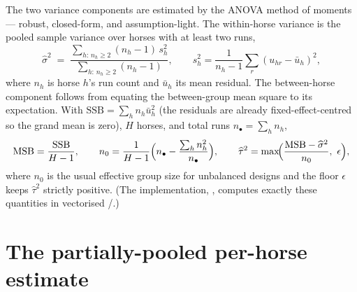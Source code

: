 The two variance components are estimated by the ANOVA method of moments --- robust, closed-form,
and assumption-light. The within-horse variance is the pooled sample variance over horses with at
least two runs,
\begin{equation}
  \widehat{\sigma}^2
   \;=\; \frac{\sum_{h:\,n_h\ge 2}(n_h-1)\,s_h^2}{\sum_{h:\,n_h\ge 2}(n_h-1)},
  \qquad
  s_h^2 = \frac{1}{n_h-1}\sum_{r}(u_{hr}-\bar u_{h})^2,
  \label{eq:sigma2}
\end{equation}
where $n_h$ is horse $h$'s run count and $\bar u_h$ its mean residual. The between-horse component
follows from equating the between-group mean square to its expectation. With
$\mathrm{SSB}=\sum_h n_h \bar u_h^2$ (the residuals are already fixed-effect-centred so the grand
mean is zero), $H$ horses, and total runs $n_\bullet=\sum_h n_h$,
\begin{equation}
  \mathrm{MSB} = \frac{\mathrm{SSB}}{H-1},
  \qquad
  n_0 = \frac{1}{H-1}\Bigl(n_\bullet - \frac{\sum_h n_h^2}{n_\bullet}\Bigr),
  \qquad
  \widehat{\tau}^2 = \max\!\Bigl(\frac{\mathrm{MSB}-\widehat\sigma^2}{n_0},\ \epsilon\Bigr),
  \label{eq:tau2}
\end{equation}
where $n_0$ is the usual effective group size for unbalanced designs and the floor $\epsilon$
keeps $\widehat\tau^2$ strictly positive. (The implementation, , computes
exactly these quantities in vectorised /.)

\section{The partially-pooled per-horse estimate}

